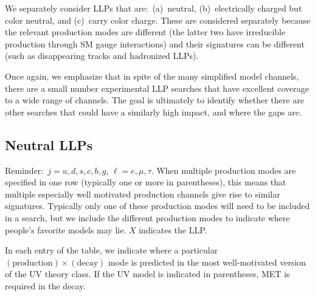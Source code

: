 We separately consider LLPs that are:~(a)~neutral, (b)~electrically charged but color neutral, and (c)~carry color charge. These are considered separately because the relevant production modes are different (the latter two have irreducible production through SM gauge interactions) and their signatures can be different (such as disappearing tracks and hadronized LLPs).

Once again, we emphasize that in spite of the many simplified model channels, there are a small number experimental LLP searches that have excellent coverage to a wide range of channels. The goal is ultimately to identify whether there are other searches that could have a similarly high impact, and where the gaps are.

\subsection{Neutral LLPs}

Reminder:~$j=u,d,s,c,b,g$, $\ell=e,\mu,\tau$.
When multiple production modes are specified in one row (typically one or more in parentheses), this means that multiple especially well motivated production channels give rise to similar signatures. Typically only one of these production modes will need to be included in a search, but we include the different production modes to indicate where people's favorite models may lie. $X$ indicates the LLP.

In each entry of the table, we indicate where a particular $(\mathrm{production})\times(\mathrm{decay})$ mode is predicted in the most well-motivated version of the UV theory class. If the UV model is indicated in parentheses, MET is required in the decay.

